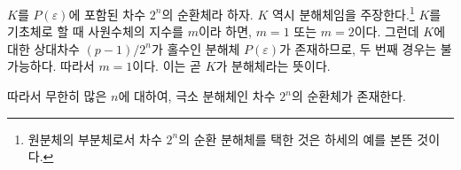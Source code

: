 $K$를 $P(\varepsilon)$에 포함된 차수 $2^n$의 순환체라 하자. $K$ 역시 분해체임을 주장한다.\footnote{원분체의 부분체로서 차수 $2^n$의 순환 분해체를 택한 것은 하세의 예를 본뜬 것이다.} $K$를 기초체로 할 때 사원수체의 지수를 $m$이라 하면, $m=1$ 또는 $m=2$이다. 그런데 $K$에 대한 상대차수 $(p-1)/2^n$가 홀수인 분해체 $P(\varepsilon)$가 존재하므로, 두 번째 경우는 불가능하다. 따라서 $m=1$이다. 이는 곧 $K$가 분해체라는 뜻이다.

따라서 무한히 많은 $n$에 대하여, 극소 분해체인 차수 $2^n$의 순환체가 존재한다.
